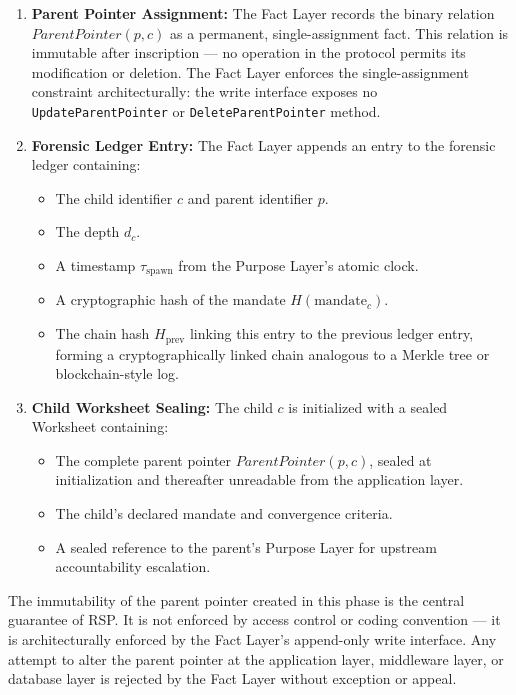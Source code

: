 \begin{enumerate}
    \item \textbf{Parent Pointer Assignment:} The Fact Layer records the binary relation $ParentPointer(p, c)$ as a permanent, single-assignment fact. This relation is immutable after inscription — no operation in the protocol permits its modification or deletion. The Fact Layer enforces the single-assignment constraint architecturally: the write interface exposes no \texttt{UpdateParentPointer} or \texttt{DeleteParentPointer} method.
    \item \textbf{Forensic Ledger Entry:} The Fact Layer appends an entry to the forensic ledger containing:
    \begin{itemize}
        \item The child identifier $c$ and parent identifier $p$.
        \item The depth $d_c$.
        \item A timestamp $\tau_{\text{spawn}}$ from the Purpose Layer's atomic clock.
        \item A cryptographic hash of the mandate $H(\text{mandate}_c)$.
        \item The chain hash $H_{\text{prev}}$ linking this entry to the previous ledger entry, forming a cryptographically linked chain analogous to a Merkle tree or blockchain-style log.
    \end{itemize}
    \item \textbf{Child Worksheet Sealing:} The child $c$ is initialized with a sealed Worksheet containing:
    \begin{itemize}
        \item The complete parent pointer $ParentPointer(p, c)$, sealed at initialization and thereafter unreadable from the application layer.
        \item The child's declared mandate and convergence criteria.
        \item A sealed reference to the parent's Purpose Layer for upstream accountability escalation.
    \end{itemize}
\end{enumerate}

The immutability of the parent pointer created in this phase is the central guarantee of RSP. It is not enforced by access control or coding convention — it is architecturally enforced by the Fact Layer's append-only write interface. Any attempt to alter the parent pointer at the application layer, middleware layer, or database layer is rejected by the Fact Layer without exception or appeal.

